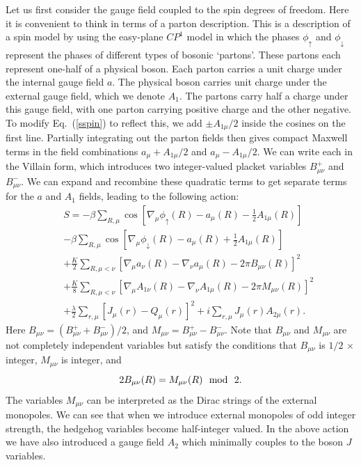 \documentclass[prb,twocolumn]{revtex4-1}
\newcommand{\cp}{$CP^1$ }
\begin{document}
Let us first consider the gauge field coupled to the spin degrees of freedom. Here it is convenient to think in terms of a parton description. This is a description of a spin model by using the easy-plane \cp model in which the phases $\phi_\uparrow$ and $\phi_\downarrow$ represent the phases of different types of bosonic `partons'. These partons each represent one-half of a physical boson. Each parton carries a unit charge under the internal gauge field $a$. The physical boson carries unit charge under the external gauge field, which we denote $A_1$. The partons carry half a charge under this gauge field, with one parton carrying positive charge and the other negative.
To modify Eq.~(\ref{sspin}) to reflect this, we add $\pm A_{1\mu}/2$ inside the cosines on the first line. 
Partially integrating out the parton fields then gives compact Maxwell terms in the field combinations $a_\mu+A_{1\mu}/2$ and $a_\mu-A_{1\mu}/2$. We can write each in the Villain form, which introduces two integer-valued placket variables $B^+_{\mu\nu}$ and $B^-_{\mu\nu}$. We can expand and recombine these quadratic terms to get separate terms for the $a$ and $A_1$ fields, leading to the following action:
\begin{eqnarray}
&&S=-\beta\sum_{R,\mu} \cos[\nabla_\mu\phi_\uparrow(R)-a_\mu(R)-\frac{1}{2}A_{1\mu}(R)]\nonumber\\
&&-\beta\sum_{R,\mu} \cos[\nabla_\mu\phi_\downarrow(R)-a_\mu(R)+\frac{1}{2}A_{1\mu}(R)]\nonumber\\
&&+\frac{K}{2}\sum_{R,\mu<\nu}\left[\nabla_\mu a_\nu(R)-\nabla_\nu a_\mu(R)-2\pi B_{\mu\nu}(R)\right]^2\nonumber\\
&&+\frac{K}{8}\sum_{R,\mu<\nu}\left[\nabla_\mu A_{1\nu}(R)-\nabla_\nu A_{1\mu}(R)-2\pi M_{\mu\nu}(R)\right]^2\nonumber\\
&&+\frac{\lambda}{2}\sum_{r,\mu} [ J_\mu(r)- Q_\mu(r)]^2+i\sum_{r,\mu}J_{\mu}(r)A_{2\mu}(r).
\label{withA}
\end{eqnarray}
Here $B_{\mu\nu}=(B^+_{\mu\nu}+B^-_{\mu\nu})/2$, and $M_{\mu\nu}=B^+_{\mu\nu}-B^-_{\mu\nu}$. Note that $B_{\mu\nu}$ and $M_{\mu\nu}$ are not completely independent variables but satisfy the conditions that $B_{\mu\nu}$ is $1/2$ $\times$ integer, $M_{\mu\nu}$ is integer, and 
\begin{equation}
2B_{\mu\nu}(R)=M_{\mu\nu}(R) ~~{\rm mod}~~2. 
\label{constraint}
\end{equation}
The variables $M_{\mu\nu}$ can be interpreted as the Dirac strings of the external monopoles. 
We can see that when we introduce external monopoles of odd integer strength, the hedgehog variables become half-integer valued. 
In the above action we have also introduced a gauge field $A_2$ which minimally couples to the boson $J$ variables.
\end{document}
